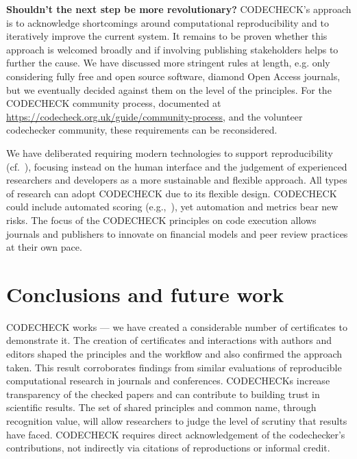\documentclass[12pt]{article}
\begin{document}
\textbf{Shouldn't the next step be more revolutionary?}  CODECHECK's
approach is to acknowledge shortcomings around computational
reproducibility and to iteratively improve the current system.  It
remains to be proven whether this approach is welcomed broadly and if
involving publishing stakeholders helps to further the cause.  We have
discussed more stringent rules at length, e.g. only considering fully
free and open source software, diamond Open Access journals, but we
eventually decided against them on the level of the principles.  For
the CODECHECK community
process, documented at
\url{https://codecheck.org.uk/guide/community-process},
and the volunteer codechecker community, these requirements can be 
reconsidered.

We have deliberated requiring modern technologies to support
reproducibility (cf.~\cite{konkol_publishing_2020}), 
focusing instead on the human interface and the judgement of experienced
researchers and developers as a more sustainable and flexible
approach.  All types of research can adopt CODECHECK due to its
flexible design.  CODECHECK could include automated scoring
(e.g.,~\cite{menke_rigor_2020}), yet automation and metrics bear new
risks.  The focus of the CODECHECK principles on code execution allows
journals and publishers to innovate on financial models and peer
review practices at their own pace.

\section*{Conclusions and future work}\label{future-work-and-conclusions}

CODECHECK works --- we have created a considerable number of
certificates to demonstrate it.  The creation of certificates and
interactions with authors and editors shaped the principles and the
workflow and also confirmed the approach taken. This result
corroborates findings from similar evaluations of reproducible
computational research in journals and conferences.  CODECHECKs
increase transparency of the checked papers and can contribute to
building trust in scientific results.
The set of shared principles and common name, through recognition
value, will allow researchers to judge the level of scrutiny that
results have faced. CODECHECK requires direct acknowledgement of the
codechecker's contributions, not indirectly via citations of
reproductions or informal credit.
\end{document}
